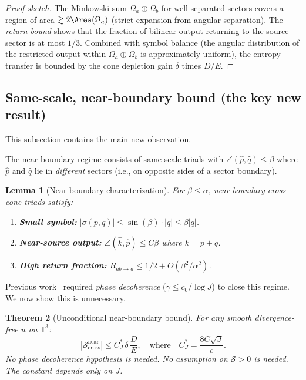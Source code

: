 \documentclass[11pt]{article}
\newtheorem{theorem}{Theorem}[section]
\newtheorem{lemma}[theorem]{Lemma}
\theoremstyle{definition}
\newcommand{\T}{\mathbb{T}}
\newcommand{\cS}{\mathcal{S}}
\begin{document}
\begin{proof}[Proof sketch]
The Minkowski sum $\Omega_a \oplus \Omega_b$ for
well-separated sectors covers a region of area
$\gtrsim 2\Area(\Omega_a)$ (strict expansion from
angular separation).  The \emph{return bound} shows
that the fraction of bilinear output returning to the
source sector is at most $1/3$.  Combined with symbol
balance (the angular distribution of the restricted output
within $\Omega_a\oplus\Omega_b$ is approximately uniform),
the entropy transfer is bounded by the cone depletion
gain $\delta$ times $D/E$.
\end{proof}


\subsection{Same-scale, near-boundary bound
(the key new result)}
\label{sec:near-boundary}

This subsection contains the main new observation.

The near-boundary regime consists of same-scale triads
with $\angle(\hat{p},\hat{q}) \leq \beta$ where
$\hat{p}$ and $\hat{q}$ lie in \emph{different} sectors
(i.e., on opposite sides of a sector boundary).

\begin{lemma}[Near-boundary characterization]
\label{lem:near-bdy}
For $\beta \leq \alpha$, near-boundary cross-cone triads
satisfy:
\begin{enumerate}[label=(\roman*)]
\item \textbf{Small symbol:}
$|\sigma(p,q)| \leq \sin(\beta)\cdot|q| \leq \beta|q|$.
\item \textbf{Near-source output:}
$\angle(\hat{k},\hat{p}) \leq C\beta$ where $k = p+q$.
\item \textbf{High return fraction:}
$R_{ab\to a} \leq 1/2 + O(\beta^2/\alpha^2)$.
\end{enumerate}
\end{lemma}

Previous work~\cite{Fontes2026Phi} required \emph{phase
decoherence} ($\gamma \leq c_0/\log J$) to close this
regime.  We now show this is unnecessary.

\begin{theorem}[Unconditional near-boundary bound]
\label{thm:near-bdy-main}
For any smooth divergence-free $u$ on $\T^3$:
\begin{equation}\label{eq:near-bdy-bound}
|\cS_{\mathrm{cross}}^{\mathrm{near}}|
\leq C_J^*\,\delta\,\frac{D}{E},
\quad\text{where}\quad
C_J^* = \frac{8C\sqrt{J}}{e}.
\end{equation}
No phase decoherence hypothesis is needed.
No assumption on $\cS > 0$ is needed.
The constant depends only on $J$.
\end{theorem}
\end{document}
